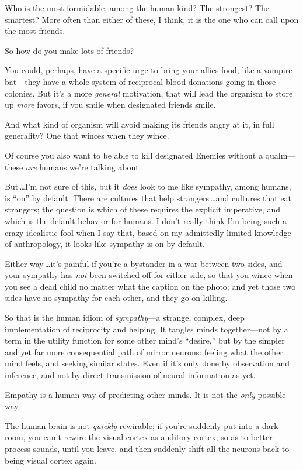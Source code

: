  Who is the most formidable, among the human kind? The strongest?
The smartest? More often than either of these, I think, it is the one
who can call upon the most friends.


 So how do you make lots of friends?


 You could, perhaps, have a specific urge to bring your allies
food, like a vampire bat---they have a whole system of reciprocal blood
donations going in those colonies. But it's a more
\textit{general} motivation, that will lead the organism to store up
\textit{more} favors, if you smile when designated friends smile.


 And what kind of organism will avoid making its friends angry at
it, in full generality? One that winces when they wince.


 Of course you also want to be able to kill designated Enemies
without a qualm---these \textit{are} humans we're
talking about.


 But\,\ldots I'm not sure of this, but it
\textit{does} look to me like sympathy, among humans, is
``on'' by default. There are
cultures that help strangers\,\ldots and cultures that eat strangers; the
question is which of these requires the explicit imperative, and which
is the default behavior for humans. I don't really
think I'm being such a crazy idealistic fool when I say
that, based on my admittedly limited knowledge of anthropology, it
looks like sympathy is on by default.


 Either way\,\ldots it's painful if
you're a bystander in a war between two sides, and your
sympathy has \textit{not} been switched off for either side, so that
you wince when you see a dead child no matter what the caption on the
photo; and yet those two sides have no sympathy for each other, and
they go on killing.


 So that is the human idiom of \textit{sympathy}{}---a strange,
complex, deep implementation of reciprocity and helping. It tangles
minds together---not by a term in the utility function for some other
mind's ``desire,''
but by the simpler and yet far more consequential path of mirror
neurons: feeling what the other mind feels, and seeking similar states.
Even if it's only done by observation and inference,
and not by direct transmission of neural information as yet.


 Empathy is a human way of predicting other minds. It is not the
\textit{only} possible way.


 The human brain is not \textit{quickly} rewirable; if
you're suddenly put into a dark room, you
can't rewire the visual cortex as auditory cortex, so
as to better process sounds, until you leave, and then suddenly shift
all the neurons back to being visual cortex again.


